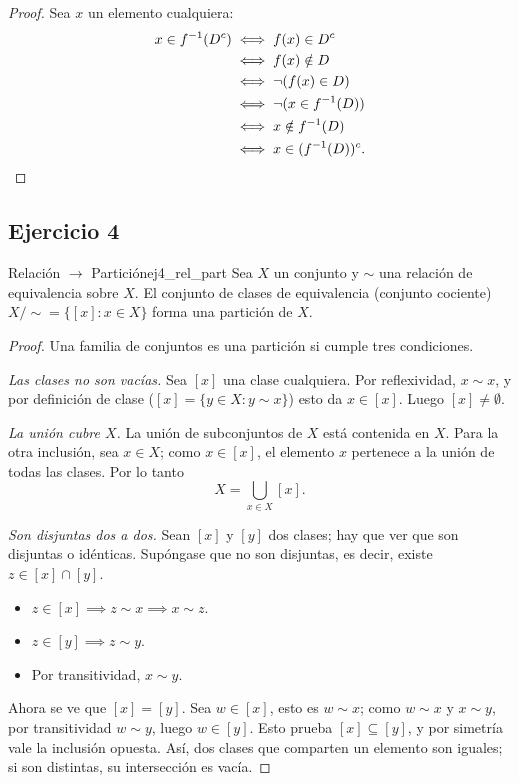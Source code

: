 \documentclass[11pt, a4paper]{article}
\begin{document}
\begin{proof}
Sea $x$ un elemento cualquiera:
\begin{align*}
x \in f^{-1}(D^c) &\iff f(x) \in D^c \\
&\iff f(x) \notin D \\
&\iff \neg (f(x) \in D) \\
&\iff \neg (x \in f^{-1}(D)) \\
&\iff x \notin f^{-1}(D) \\
&\iff x \in (f^{-1}(D))^c. \qedhere
\end{align*}
\end{proof}

\subsection*{Ejercicio 4}

\begin{proposicion}{Relación $\to$ Partición}{ej4_rel_part}
Sea $X$ un conjunto y $\sim$ una relación de equivalencia sobre $X$.
El conjunto de clases de equivalencia (conjunto cociente) $X/\sim = \{ [x] : x \in X \}$ forma una
partición de $X$.
\end{proposicion}

\begin{proof}
Una familia de conjuntos es una partición si cumple tres condiciones.

\textit{Las clases no son vacías.} Sea $[x]$ una clase cualquiera. Por reflexividad, $x \sim x$, y
por definición de clase ($[x] = \{y \in X : y \sim x\}$) esto da $x \in [x]$. Luego
$[x] \neq \emptyset$.

\textit{La unión cubre $X$.} La unión de subconjuntos de $X$ está contenida en $X$. Para la otra
inclusión, sea $x \in X$; como $x \in [x]$, el elemento $x$ pertenece a la unión de todas las clases.
Por lo tanto
$$ X = \bigcup_{x \in X} [x]. $$

\textit{Son disjuntas dos a dos.} Sean $[x]$ y $[y]$ dos clases; hay que ver que son disjuntas o
idénticas. Supóngase que no son disjuntas, es decir, existe $z \in [x] \cap [y]$.
\begin{itemize}
    \item $z \in [x] \implies z \sim x \implies x \sim z$.
    \item $z \in [y] \implies z \sim y$.
    \item Por transitividad, $x \sim y$.
\end{itemize}
Ahora se ve que $[x] = [y]$. Sea $w \in [x]$, esto es $w \sim x$; como $w \sim x$ y $x \sim y$, por
transitividad $w \sim y$, luego $w \in [y]$. Esto prueba $[x] \subseteq [y]$, y por simetría vale la
inclusión opuesta. Así, dos clases que comparten un elemento son iguales; si son distintas, su
intersección es vacía.
\end{proof}
\end{document}
